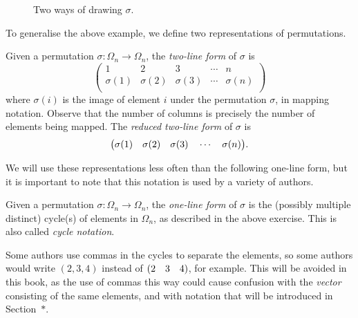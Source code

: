 \begin{example}
\begin{figure}[ht]
        \caption{Two ways of drawing $\sigma$.}
        \label{fig:sigma}
    \end{figure}
\end{example}

To generalise the above example, we define two representations of permutations.\newpage

\begin{definition}
    Given a permutation $\sigma \colon \Omega_{n} \to \Omega_{n}$, the \textit{two-line form} of $\sigma$ is
    \[
    \begin{pmatrix}
        1         & 2         & 3         & \cdots & n \\
        \sigma(1) & \sigma(2) & \sigma(3) & \cdots & \sigma(n) \\
    \end{pmatrix}
    \]
    where $\sigma(i)$ is the image of element $i$ under the permutation $\sigma$, in mapping notation. Observe that the number of columns is precisely the number of elements being mapped. The \textit{reduced two-line form} of $\sigma$ is
    \[
    \big(\sigma(1) \quad \sigma(2) \quad \sigma(3) \quad \cdots \quad \sigma(n)\big).
    \]
\end{definition}

We will use these representations less often than the following one-line form, but it is important to note that this notation is used by a variety of authors.

\begin{definition}
    Given a permutation $\sigma \colon \Omega_{n} \to \Omega_{n}$, the \textit{one-line form} of $\sigma$ is the (possibly multiple distinct) cycle(s) of elements in $\Omega_{n}$, as described in the above exercise. This is also called \textit{cycle notation}.
\end{definition}

Some authors use commas in the cycles to separate the elements, so some authors would write $(2, 3, 4)$ instead of $(2 \quad 3 \quad 4)$, for example. This will be avoided in this book, as the use of commas this way could cause confusion with the \textit{vector} consisting of the same elements, and with notation that will be introduced in Section~$*$.

